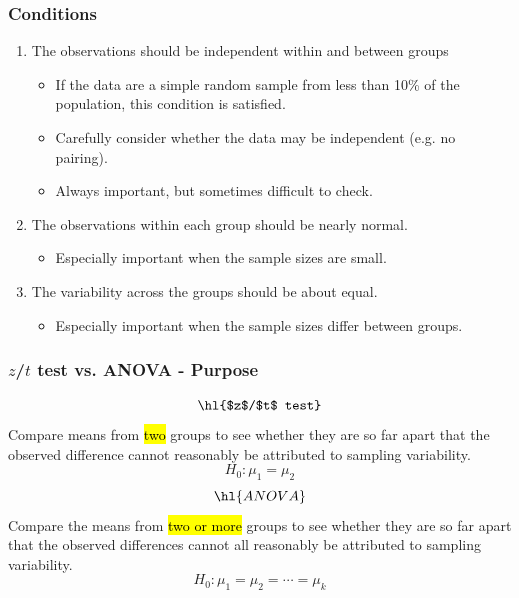 \documentclass[slidestop,compress,mathserif]{beamer}
\begin{document}
\begin{frame}
\frametitle{Conditions}

\begin{enumerate}

\item The observations should be independent within and between groups

\begin{itemize}
\item If the data are a simple random sample from less than 10\% of the population, this condition is satisfied.
\item Carefully consider whether the data may be independent (e.g. no pairing). 
\item Always important, but sometimes difficult to check.
\end{itemize}

\pause

\item The observations within each group should be nearly normal.

\begin{itemize}
\item Especially important when the sample sizes are small.
\end{itemize}


\pause

\item The variability across the groups should be about equal.

\begin{itemize}
\item Especially important when the sample sizes differ between groups.
\end{itemize}


\end{enumerate}

\end{frame}


\begin{frame}
\frametitle{$z$/$t$ test vs. ANOVA - Purpose}

{
\[ \hl{$z$/$t$ test} \]
Compare means from \hl{two} groups to see whether they are so far apart that the observed difference cannot reasonably be attributed to sampling variability.
\[ H_0: \mu_1 = \mu_2 \]
}
{
\[ \hl{ANOVA} \]
Compare the means from \hl{two or more} groups to see whether they are so far apart that the observed differences cannot all reasonably be attributed to sampling variability.
\[ H_0: \mu_1 = \mu_2 = \cdots = \mu_k \]
}

\end{frame}
\end{document}
